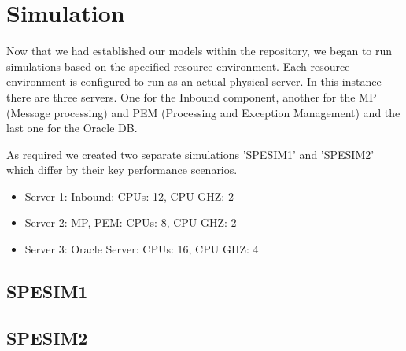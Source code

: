 \documentclass[a4paper,11pt]{report}
\begin{document}
\chapter*{Simulation}
Now that we had established our models within the repository, we
began to run simulations based on the specified resource environment.
Each resource environment is configured to run as an actual physical server. In this instance there are three servers. One for the Inbound component, another for the MP (Message processing) and PEM (Processing and Exception Management) and the last one for the Oracle DB.

As required we created two separate simulations 'SPESIM1' and
'SPESIM2' which differ by their key performance scenarios.

\begin{itemize}
\item Server 1: Inbound: CPUs: 12, CPU GHZ: 2
\item Server 2: MP, PEM: CPUs: 8, CPU GHZ: 2
\item Server 3: Oracle Server: CPUs: 16, CPU GHZ: 4
\end{itemize}

\section*{SPESIM1}

\section*{SPESIM2}

\end{document}
